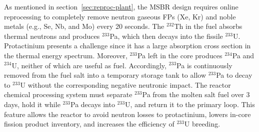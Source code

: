 As mentioned in section~\ref{sec:reproc-plant}, the \gls{MSBR} design 
requires online reprocessing to completely remove neutron gaseous \glspl{FP} 
(Xe, Kr) and noble metals (e.g., Se, Nb, and Mo) every 20 seconds.  The 
$^{232}$Th in the fuel absorbs thermal neutrons and produces $^{233}$Pa, which 
then decays into the fissile $^{233}$U. Protactinium presents a challenge 
since it has a large absorption cross section in the thermal energy spectrum. 
Moreover, $^{233}$Pa left in the core produces $^{234}$Pa and $^{234}$U, 
neither of which are useful as fuel. Accordingly, $^{233}$Pa is continuously 
removed from the fuel salt into a temporary storage tank to allow $^{233}$Pa 
to decay to $^{233}$U without the corresponding negative neutronic impact. The 
reactor chemical processing system must separate $^{233}$Pa from the molten 
salt fuel over 3 days, hold it while $^{233}$Pa decays into $^{233}$U, and 
return it to the primary loop. This feature allows the reactor to avoid 
neutron losses to protactinium, lowers in-core fission product inventory, and 
increases the efficiency of $^{233}$U breeding.

